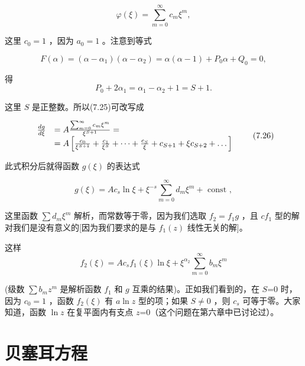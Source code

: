\begin{equation*}
\varphi (\xi) = \sum_ {m = 0} ^ {\infty} c _ {m} \xi^ {m},
\end{equation*}

这里 $c_{0} = 1$ ，因为 $a_0 = 1$ 。注意到等式

\begin{equation*}
F (\alpha) = \left(\alpha - \alpha_ {1}\right) \left(\alpha - \alpha_ {2}\right) = \alpha (\alpha - 1) + P _ {0} \alpha + Q _ {0} = 0,
\end{equation*}

得
\begin{equation*}
P _ {0} + 2 \alpha_ {1} = \alpha_ {1} - \alpha_ {2} + 1 = S + 1.
\end{equation*}

这里 $S$ 是正整数。所以(7.25)可改写成

\begin{equation*}
\begin{array}{r l} \frac {d g}{d \xi} & = A \frac {\sum_ {m = 0} ^ {\infty} c _ {m} \xi^ {m}}{\xi^ {S + 1}} = \\ & = A \left[ \frac {c _ {0}}{\xi^ {S + 1}} + \frac {c _ {1}}{\xi^ {S}} + \dots + \frac {c _ {S}}{\xi} + c _ {S + 1} + \xi c _ {S + 2} + \dots \right] \end{array}\tag{7.26}
\end{equation*}

此式积分后就得函数 $g(\xi)$ 的表达式

\begin{equation*}
g (\xi) = A c _ {s} \ln \xi + \xi^ {- s} \sum_ {m = 0} ^ {\infty} d _ {m} \xi^ {m} + \text { const },\tag{7.27}
\end{equation*}

这里函数 $\sum d_{m}\xi^{m}$ 解析，而常数等于零，因为我们选取 $f_{2} = f_{1}g$ ，且 $cf_{1}$ 型的解对我们是没有意义的[因为我们要求的是与 $f_{1}(z)$ 线性无关的解]。

这样
\begin{equation*}
f _ {2} (\xi) = A c _ {s} f _ {1} (\xi) \ln \xi + \xi^ {\alpha_ {2}} \sum_ {m = 0} ^ {\infty} b _ {m} \xi^ {m}\tag{7.28}
\end{equation*}

(级数 $\sum b_{m}z^{m}$ 是解析函数 $f_{1}$ 和 $g$ 互乘的结果)。正如我们看到的，在 $S$=0 时，因为 $c_{0}=1$ ，函数 $f_{2}(\xi)$ 有 $a\ln z$ 型的项；如果 $S\neq0$ ，则 $c_{s}$ 可等于零。大家知道，函数 $\ln z$ 在复平面内有支点 $z$=0（这个问题在第六章中已讨论过）。

\section{贝塞耳方程}

